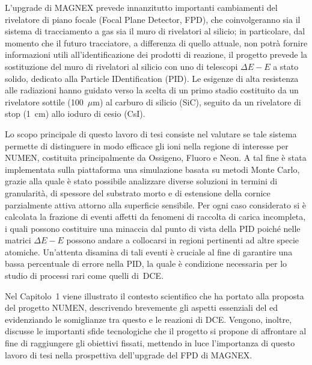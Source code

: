 L'upgrade di MAGNEX prevede innanzitutto importanti cambiamenti del rivelatore di piano focale (Focal Plane Detector, FPD), che coinvolgeranno sia il sistema di tracciamento a gas sia il muro di rivelatori al silicio; in particolare, dal momento che il futuro tracciatore, a differenza di quello attuale, non potrà fornire informazioni utili all'identificazione dei prodotti di reazione, il progetto prevede la sostituzione del muro di rivelatori al silicio con uno di telescopi $\Delta E - E$ a stato solido, dedicato alla Particle IDentification (PID). 
Le esigenze di alta resistenza alle radiazioni hanno guidato verso la scelta di un primo stadio costituito da un rivelatore sottile (100~$\mu$m) al carburo di silicio (SiC), seguito da un rivelatore di stop (1~cm) allo ioduro di cesio (CsI).

Lo scopo principale di questo lavoro di tesi consiste nel valutare se tale sistema permette di distinguere in modo efficace gli ioni nella regione di interesse per NUMEN, costituita principalmente da Ossigeno, Fluoro e Neon.
A tal fine è stata implementata sulla piattaforma \geant{} una simulazione basata su metodi Monte Carlo, grazie alla quale è stato possibile analizzare diverse soluzioni in termini di granularità, di spessore del substrato morto e di estensione della cornice parzialmente attiva attorno alla superficie sensibile.
Per ogni caso considerato si è calcolata la frazione di eventi affetti da fenomeni di raccolta di carica incompleta, i quali possono costituire una minaccia dal punto di vista della PID poiché nelle matrici $\Delta E - E$ possono andare a collocarsi in regioni pertinenti ad altre specie atomiche.
Un'attenta disamina di tali eventi è cruciale al fine di garantire una bassa percentuale di errore nella PID, la quale è condizione necessaria per lo studio di processi rari come quelli di~DCE.


Nel Capitolo~1 viene illustrato il contesto scientifico che ha portato alla proposta del progetto NUMEN, descrivendo brevemente gli aspetti essenziali del \doppiobeta{} ed evidenziando le somiglianze tra questo e le reazioni di DCE.
Vengono, inoltre, discusse le importanti sfide tecnologiche che il progetto si propone di affrontare al fine di raggiungere gli obiettivi fissati, mettendo in luce l'importanza di questo lavoro di tesi nella prospettiva dell'upgrade del FPD di MAGNEX.


